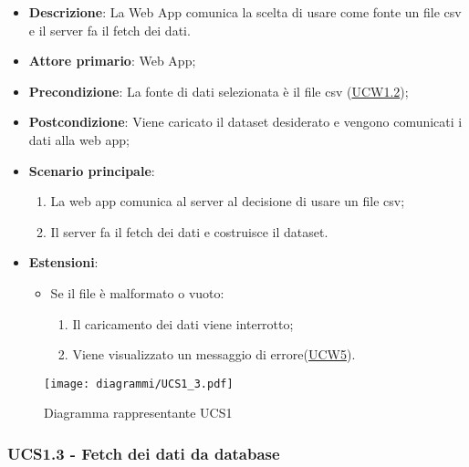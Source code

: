 \begin{itemize}

	\item \textbf{Descrizione}: La Web App comunica la scelta di usare come fonte un file csv e il server fa il fetch dei dati.
	
    \item \textbf{Attore primario}: Web App;
	        
    \item \textbf{Precondizione}:   La fonte di dati selezionata è il file csv (\hyperref[ssub:ucw1.2]{UCW1.2});

    \item \textbf{Postcondizione}:  Viene caricato il dataset desiderato  e vengono comunicati i dati alla web app;

	\item \textbf{Scenario principale}:
		\begin{enumerate}
			\item La web app comunica al server al decisione di usare un file csv;
            \item Il server fa il fetch dei dati e costruisce il dataset.
        \end{enumerate}
		
	\item \textbf{Estensioni}:
		\begin{itemize}
		
			\item Se il file è malformato o vuoto:
			\begin{enumerate}
				
				\item Il caricamento dei dati viene interrotto;
				\item Viene visualizzato un messaggio di errore(\hyperref[sub:ucw5]{UCW5}).
				
			\end{enumerate}
		
		\end{itemize}
	
\end{itemize}

\begin{figure}[h]
    \centering
    \texttt{[image: diagrammi/UCS1\_3.pdf]}
    \caption{Diagramma rappresentante UCS1}
    \label{fig:UCS1_3}
\end{figure}

\subsubsection{UCS1.3 - Fetch dei dati da database}
\label{ssub:ucs1.3}

